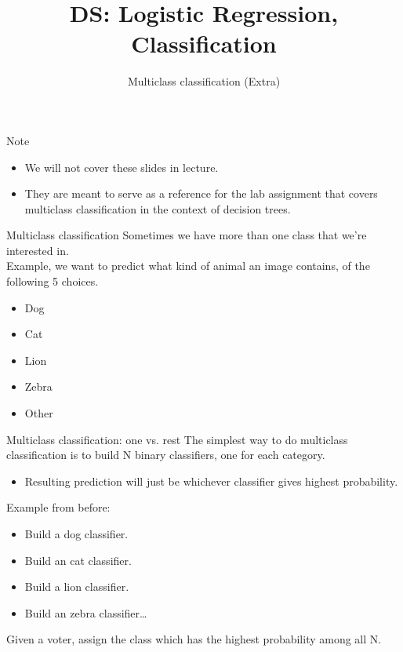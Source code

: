 \documentclass[aspectratio=169]{../latex_main/tntbeamer}  %
\title[Introduction]{DS: Logistic Regression, Classification}
\subtitle{Multiclass classification (Extra)}
\begin{document}
	
	\maketitle
	\begin{frame}{Note}
	    \begin{itemize}
	        \item We will not cover these slides in lecture.
	        \item They are meant to serve as a reference for the lab assignment that covers multiclass classification in the context of decision trees.
	    \end{itemize}
	\end{frame}
	
	
	\begin{frame}{Multiclass classification}
	    Sometimes we have more than one class that we’re interested in.\\
	    \bigskip
	    Example, we want to predict what kind of animal an image contains, of the following 5 choices.
	    \begin{itemize}
	        \item Dog
	        \item Cat
	        \item Lion
	        \item Zebra
	        \item Other
	    \end{itemize}
	\end{frame}
	
	
	\begin{frame}{Multiclass classification: one vs. rest}
	    The simplest way to do multiclass classification is to build N binary classifiers, one for each category.
	    \begin{itemize}
	        \item Resulting prediction will just be whichever classifier gives highest probability.
	    \end{itemize}
	    Example from before:
	    \begin{itemize}
	        \item Build a dog classifier.
	        \item Build an cat classifier.
	        \item Build a lion classifier.
	        \item Build an zebra classifier…
	    \end{itemize}
	    Given a voter, assign the class which has the highest probability among all N.
	\end{frame}
	
\end{document}

